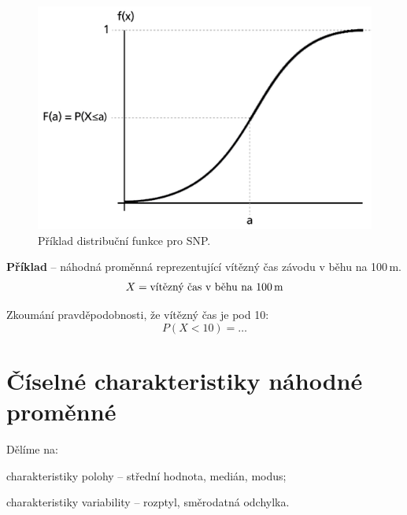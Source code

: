 \begin{compactitem}
    \begin{figure}[H]
        \centering
        \includegraphics[width=0.5\linewidth]{snp_distribution_function.png}
        \caption{Příklad distribuční funkce pro SNP.}
    \end{figure}

    \item \textbf{Příklad} -- náhodná proměnná reprezentující vítězný čas závodu v běhu na 100\,m.
    $$ X = \text{vítězný čas v běhu na 100\,m} $$ \begin{compactitem}
        \item Zkoumání pravděpodobnosti, že vítězný čas je pod 10:
        $$ P(X < 10) = \ldots$$
    \end{compactitem}

\end{compactitem}


\section{Číselné charakteristiky náhodné proměnné}

\begin{compactitem}
    \item Dělíme na: \begin{compactitem}
        \item charakteristiky polohy -- střední hodnota, medián, modus;
        \item charakteristiky variability -- rozptyl, směrodatná odchylka.
    \end{compactitem}
\end{compactitem}

